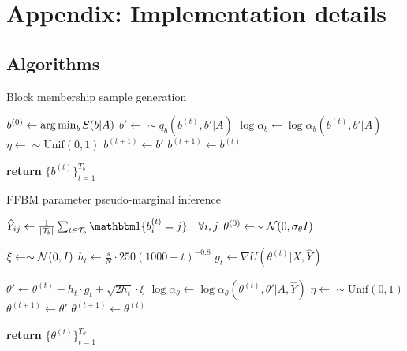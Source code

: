 \section{Appendix: Implementation details}

\subsection{Algorithms}
\label{appdx:algorithms}

\begin{algorithm} %
	\caption{Block membership sample generation} %
	\label{alg:b-samples} %
	\begin{algorithmic} %
		\State $b^{(0)} \gets \operatorname*{arg\,min}_b S(b|A)$ 
		\State $b' \gets \sim q_b(b^{(t)}, b' | A)$
		\State $\log \alpha_b \gets \log \alpha_b(b^{(t)}, b' | A)$
		\State $\eta \gets \sim \textrm{Unif}(0,1)$
		\State $b^{(t+1)} \gets b'$
		\Else
		\State $b^{(t+1)} \gets b^{(t)}$
		\EndIf
		\EndFor
		
		\State \textbf{return} $\{b^{(t)}\}_{t=1}^{T_b}$
		\EndProcedure
	\end{algorithmic}
\end{algorithm}

\begin{algorithm} %
	\caption{FFBM parameter pseudo-marginal inference} %
	\label{alg:theta-samples} %
	\begin{algorithmic} %
		\State $\hat{Y}_{ij} \gets \frac{1}{|\Tcal_b|} \sum_{t \in \Tcal_b} \one \{ b^{(t)}_i = j\} \quad \forall i,j$
		\State $\theta^{(0)} \gets \sim \mathcal{N}(0, \sigma_\theta I)$
		
		\item[]
		
		\State $\xi \gets \sim \mathcal{N}(0, I)$
		\State $h_t \gets \frac{s}{N} \cdot 250(1000 + t)^{-0.8}$
		\State $g_t \gets \nabla U(\theta^{(t)}| X, \hat{Y})$
		\item[]
		\State $\theta' \gets \theta^{(t)} - h_t \cdot g_t + \sqrt{2h_t} \cdot \xi$
		\State $\log \alpha_\theta \gets \log \alpha_\theta(\theta^{(t)}, \theta' | A, \hat{Y})$
		\State $\eta \gets \sim \textrm{Unif}(0,1)$
		\If{$\log \eta < \log \alpha_\theta$}
		\State $\theta^{(t+1)} \gets \theta'$
		\Else
		\State $\theta^{(t+1)} \gets \theta^{(t)}$
		\EndIf
		\EndFor
		
		\State \textbf{return} $\{\theta^{(t)}\}_{t=1}^{T_\theta}$
		\EndProcedure
	\end{algorithmic}
\end{algorithm}

